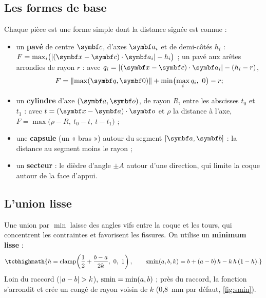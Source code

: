 \subsection{Les formes de base}

Chaque pièce est une forme simple dont la distance signée est connue :
\begin{itemize}
  \item un \textbf{pavé} de centre $\vb{c}$, d'axes $\vb{a}_i$ et de demi-côtés $h_i$ :
  $F = \max_i \bigl(\abs{(\vb{x} - \vb{c})\cdot\vb{a}_i} - h_i\bigr)$ ; un pavé aux arêtes arrondies de rayon $r$ :
  avec $q_i = \abs{(\vb{x} - \vb{c})\cdot\vb{a}_i} - (h_i - r)$,
  \begin{equation}
    F = \norm{\max(\vb{q}, \vb{0})} + \min\bigl(\max_i q_i,\ 0\bigr) - r ;
  \end{equation}
  \item un \textbf{cylindre} d'axe $(\vb{a}, \vb{o})$, de rayon $R$, entre les abscisses $t_0$ et $t_1$ : avec
  $t = (\vb{x} - \vb{a})\cdot\vb{o}$ et $\rho$ la distance à l'axe,
  $F = \max\bigl(\rho - R,\ t_0 - t,\ t - t_1\bigr)$ ;
  \item une \textbf{capsule} (un « bras ») autour du segment $[\vb{a}, \vb{b}]$ : la distance au segment moins le rayon ;
  \item un \textbf{secteur} : le dièdre d'angle $\pm A$ autour d'une direction, qui limite la coque autour de la face
  d'appui.
\end{itemize}

\subsection{L'union lisse}

Une union par $\min$ laisse des angles vifs entre la coque et les tours, qui concentrent les contraintes et
favorisent les fissures. On utilise un \textbf{minimum lisse} \cite{quilez2013} :
\begin{equation}
  \tcbhighmath{h = \clamp\!\left(\frac12 + \frac{b - a}{2k},\ 0,\ 1\right), \qquad
  \smin(a, b, k) = b + (a - b)\,h - k\,h\,(1 - h).}
\end{equation}
Loin du raccord ($\lvert a - b\rvert > k$), $\operatorname{smin} = \min(a, b)$ ; près du raccord, la fonction s'arrondit et crée un congé de
rayon voisin de $k$ (0,8~mm par défaut, \cref{fig:smin}).


